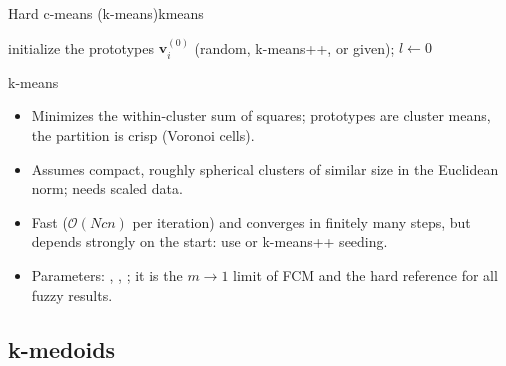 \begin{algobox}{Hard c-means (k-means)}{kmeans}
\begin{algorithm}[H]
initialize the prototypes $\mathbf{v}_i^{(0)}$ (random, k-means++, or given); $l\leftarrow0$\;
\end{algorithm}
\end{algobox}
\begin{summarybox}{k-means}
\begin{itemize}
  \item Minimizes the within-cluster sum of squares; prototypes are cluster means, the partition is crisp (Voronoi cells).
  \item Assumes compact, roughly spherical clusters of similar size in the Euclidean norm; needs scaled data.
  \item Fast ($\mathcal{O}(Ncn)$ per iteration) and converges in finitely many steps, but depends strongly on the start: use  or k-means++ seeding.
  \item Parameters: , , ; it is the $m\to1$ limit of FCM and the hard reference for all fuzzy results.
\end{itemize}
\end{summarybox}

\subsection{k-medoids}\label{sec:part:kmedoids}

